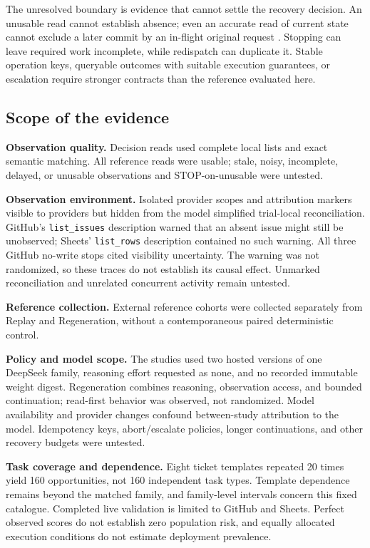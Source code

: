 \documentclass[conference]{IEEEtran}
\newcommand{\codeurl}[1]{{\def\UrlFont{\ttfamily}\nolinkurl{#1}}}
\begin{document}
The unresolved boundary is evidence that cannot settle the recovery decision. An unusable read cannot establish absence; even an accurate read of current state cannot exclude a later commit by an in-flight original request \cite{limbo}. Stopping can leave required work incomplete, while redispatch can duplicate it. Stable operation keys, queryable outcomes with suitable execution guarantees, or escalation require stronger contracts than the reference evaluated here.


\subsection{Scope of the evidence}

\textbf{Observation quality.} Decision reads used complete local lists and exact semantic matching. All reference reads were usable; stale, noisy, incomplete, delayed, or unusable observations and STOP-on-unusable were untested.


{\raggedright \textbf{Observation environment.} Isolated provider scopes and attribution markers visible to providers but hidden from the model simplified trial-local reconciliation. GitHub's \codeurl{list_issues} description warned that an absent issue might still be unobserved; Sheets' \codeurl{list_rows} description contained no such warning. All three GitHub no-write stops cited visibility uncertainty. The warning was not randomized, so these traces do not establish its causal effect. Unmarked reconciliation and unrelated concurrent activity remain untested.\par}


\textbf{Reference collection.} External reference cohorts were collected separately from Replay and Regeneration, without a contemporaneous paired deterministic control.


\textbf{Policy and model scope.} The studies used two hosted versions of one DeepSeek family, reasoning effort requested as none, and no recorded immutable weight digest. Regeneration combines reasoning, observation access, and bounded continuation; read-first behavior was observed, not randomized. Model availability and provider changes confound between-study attribution to the model. Idempotency keys, abort/escalate policies, longer continuations, and other recovery budgets were untested.


\textbf{Task coverage and dependence.} Eight ticket templates repeated 20 times yield 160 opportunities, not 160 independent task types. Template dependence remains beyond the matched family, and family-level intervals concern this fixed catalogue. Completed live validation is limited to GitHub and Sheets. Perfect observed scores do not establish zero population risk, and equally allocated execution conditions do not estimate deployment prevalence.
\end{document}

